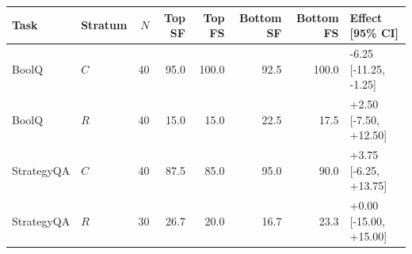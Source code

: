 \begin{tabular}{llrrrrrl}
\toprule
Task & Stratum & $N$ & Top SF & Top FS & Bottom SF & Bottom FS & Effect [95\% CI]\\
\midrule
BoolQ & $C$ & 40 & 95.0 & 100.0 & 92.5 & 100.0 & -6.25 [-11.25, -1.25]\\
BoolQ & $R$ & 40 & 15.0 & 15.0 & 22.5 & 17.5 & +2.50 [-7.50, +12.50]\\
StrategyQA & $C$ & 40 & 87.5 & 85.0 & 95.0 & 90.0 & +3.75 [-6.25, +13.75]\\
StrategyQA & $R$ & 30 & 26.7 & 20.0 & 16.7 & 23.3 & +0.00 [-15.00, +15.00]\\
\bottomrule
\end{tabular}
